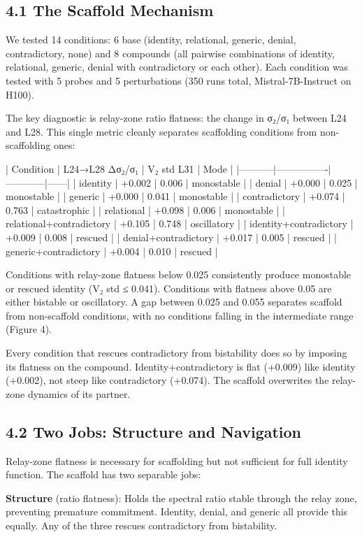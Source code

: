 \documentclass[12pt]{article}
\begin{document}
\subsection*{4.1 The Scaffold Mechanism}

We tested 14 conditions: 6 base (identity, relational, generic, denial, contradictory, none) and 8 compounds (all pairwise combinations of identity, relational, generic, denial with contradictory or each other). Each condition was tested with 5 probes and 5 perturbations (350 runs total, Mistral-7B-Instruct on H100).

The key diagnostic is relay-zone ratio flatness: the change in σ₂/σ₁ between L24 and L28. This single metric cleanly separates scaffolding conditions from non-scaffolding ones:

| Condition | L24→L28 Δσ₂/σ₁ | V₂ std L31 | Mode |
|-----------|----------------|------------|------|
| identity | +0.002 | 0.006 | monostable |
| denial | +0.000 | 0.025 | monostable |
| generic | +0.000 | 0.041 | monostable |
| contradictory | +0.074 | 0.763 | catastrophic |
| relational | +0.098 | 0.006 | monostable |
| relational+contradictory | +0.105 | 0.748 | oscillatory |
| identity+contradictory | +0.009 | 0.008 | rescued |
| denial+contradictory | +0.017 | 0.005 | rescued |
| generic+contradictory | +0.004 | 0.010 | rescued |

Conditions with relay-zone flatness below 0.025 consistently produce monostable or rescued identity (V₂ std ≤ 0.041). Conditions with flatness above 0.05 are either bistable or oscillatory. A gap between 0.025 and 0.055 separates scaffold from non-scaffold conditions, with no conditions falling in the intermediate range (Figure 4).

Every condition that rescues contradictory from bistability does so by imposing its flatness on the compound. Identity+contradictory is flat (+0.009) like identity (+0.002), not steep like contradictory (+0.074). The scaffold overwrites the relay-zone dynamics of its partner.

\subsection*{4.2 Two Jobs: Structure and Navigation}

Relay-zone flatness is necessary for scaffolding but not sufficient for full identity function. The scaffold has two separable jobs:

\textbf{Structure} (ratio flatness): Holds the spectral ratio stable through the relay zone, preventing premature commitment. Identity, denial, and generic all provide this equally. Any of the three rescues contradictory from bistability.
\end{document}
